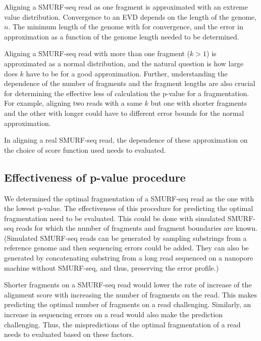 Aligning a SMURF-seq read as one fragment is approximated with an
extreme value distribution. Convergence to an EVD depends on the length
of the genome, $n$. The minimum length of the genome with for
convergence, and the error in approximation as a function of the genome
length needed to be determined.

Aligning a SMURF-seq read with more than one fragment ($k > 1$) is
approximated as a normal distribution, and the natural question is how
large does $k$ have to be for a good approximation. Further,
understanding the dependence of the number of fragments and the fragment
lengths are also crucial for determining the effective less of
calculation the p-value for a fragmentation. For example, aligning two
reads with a same $k$ but one with shorter fragments and the other with
longer could have to different error bounds for the normal approximation.

In aligning a real SMURF-seq read, the dependence of these approximation 
on the choice of score function used needs to evaluated. 


\subsection*{Effectiveness of p-value procedure}
We determined the optimal fragmentation of a SMURF-seq read as the one
with the lowest p-value. The effectiveness of this procedure for
predicting the optimal fragmentation need to be evaluated. This could
be done with simulated SMURF-seq reads for which the number of fragments
and fragment boundaries are known. (Simulated SMURF-seq reads can be
generated by sampling substrings from a reference genome and then
sequencing errors could be added. They can also be generated by
concatenating substring from a long read sequenced on a nanopore machine
without SMURF-seq, and thus, preserving the error profile.)

Shorter fragments on a SMURF-seq read would lower the rate of increase
of the alignment score with increasing the number of fragments on the
read. This makes predicting the optimal number of fragments on a read
challenging.
Similarly, an increase in sequencing errors on a read would also make
the prediction challenging. 
%
Thus, the mispredictions of the optimal fragmentation of a read needs to
evaluated based on these factors.

